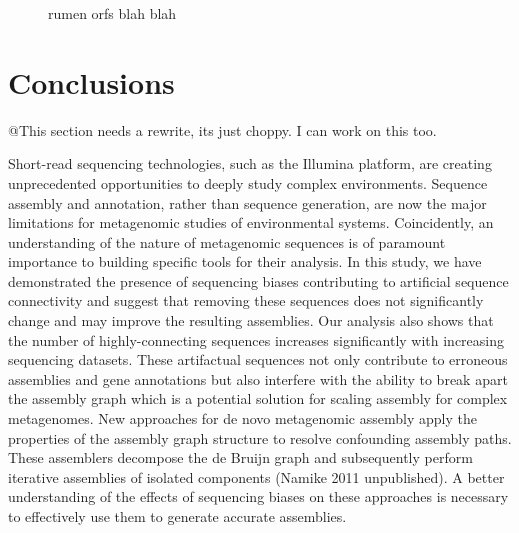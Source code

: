 \documentclass[11pt]{article} %
\begin{document}
\begin{figure}
\caption{rumen orfs blah blah}
\end{figure}

\section{Conclusions}

@This section needs a rewrite, its just choppy.  I can work on this too.

Short-read sequencing technologies, such as the Illumina platform, are creating unprecedented opportunities to deeply study complex environments.  Sequence assembly and annotation, rather than sequence generation, are now the major limitations for metagenomic studies of environmental systems.  Coincidently, an understanding of the nature of metagenomic sequences is of paramount importance to building specific tools for their analysis.  In this study, we have demonstrated the presence of sequencing biases contributing to artificial sequence connectivity and suggest that removing these sequences does not significantly change and may improve the resulting assemblies. Our analysis also shows that the number of highly-connecting sequences increases significantly with increasing sequencing datasets.  These artifactual sequences not only contribute to erroneous assemblies and gene annotations but also interfere with the ability to break apart the assembly graph which is a potential solution for scaling assembly for complex metagenomes. New approaches for de novo metagenomic assembly apply the properties of the assembly graph structure to resolve confounding assembly paths. These assemblers decompose the de Bruijn graph and subsequently perform iterative assemblies of isolated components \cite{Peng:2011p898} (Namike 2011 unpublished).  A better understanding of the effects of sequencing biases on these approaches is necessary to effectively use them to generate accurate assemblies.  
\end{document}
